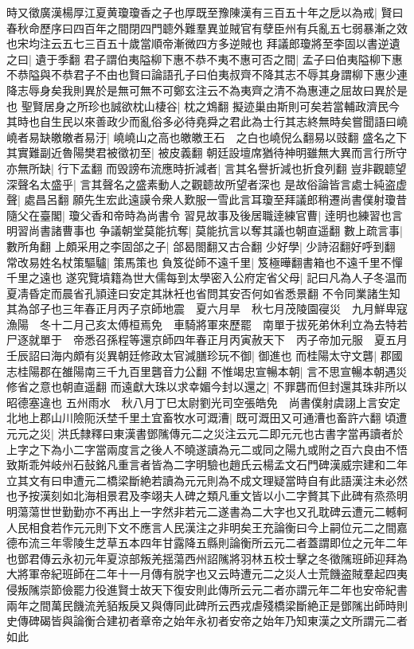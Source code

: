 時又徵廣漢楊厚江夏黄瓊瓊香之子也厚既至豫陳漢有三百五十年之戹以為戒|{
	賢曰春秋命歷序曰四百年之間閉四門聼外難羣異並賊官有孽臣州有兵亂五七弱暴漸之效也宋均注云五七三百五十歲當順帝漸微四方多逆賊也}
拜議郎瓊將至李固以書逆遺之曰|{
	遺于季翻}
君子謂伯夷隘柳下惠不恭不夷不惠可否之間|{
	孟子曰伯夷隘柳下惠不恭隘與不恭君子不由也賢曰論語孔子曰伯夷叔齊不降其志不辱其身謂柳下惠少連降志辱身矣我則異於是無可無不可鄭玄注云不為夷齊之清不為惠連之屈故曰異於是也}
聖賢居身之所珍也誠欲枕山棲谷|{
	枕之鴆翻}
擬迹巢由斯則可矣若當輔政濟民今其時也自生民以來善政少而亂俗多必待堯舜之君此為士行其志終無時矣嘗聞語曰嶢嶢者易缺皦皦者易汙|{
	嶢嶢山之高也皦皦王石　之白也嶢倪么翻易以豉翻}
盛名之下其實難副近魯陽樊君被徵初至|{
	被皮義翻}
朝廷設壇席猶待神明雖無大異而言行所守亦無所缺|{
	行下孟翻}
而毁謗布流應時折減者|{
	言其名譽折減也折食列翻}
豈非觀聼望深聲名太盛乎|{
	言其聲名之盛素動人之觀聼故所望者深也}
是故俗論皆言處士純盗虚聲|{
	處昌呂翻}
願先生宏此遠謨令衆人歎服一雪此言耳瓊至拜議郎稍遷尚書僕射瓊昔隨父在臺閣|{
	瓊父香和帝時為尚書令}
習見故事及後居職逹練官曹|{
	逹明也練習也言明習尚書諸曹事也}
争議朝堂莫能抗奪|{
	莫能抗言以奪其議也朝直遥翻}
數上疏言事|{
	數所角翻}
上頗采用之李固郃之子|{
	郃曷閤翻又古合翻}
少好學|{
	少詩沼翻好呼到翻}
常改易姓名杖策驅驢|{
	策馬策也}
負笈從師不遠千里|{
	笈極曄翻書箱也不遠千里不憚千里之遠也}
遂究覽墳籍為世大儒每到太學密入公府定省父母|{
	記曰凡為人子冬温而夏凊昏定而晨省孔頴逹曰安定其牀衽也省問其安否何如省悉景翻}
不令同業諸生知其為郃子也三年春正月丙子京師地震　夏六月旱　秋七月茂陵園寑災　九月鮮卑寇漁陽　冬十二月己亥太傅桓焉免　車騎將軍來歷罷　南單于拔死弟休利立為去特若尸逐就單于　帝悉召孫程等還京師四年春正月丙寅赦天下　丙子帝加元服　夏五月壬辰詔曰海内頗有災異朝廷修政太官減膳珍玩不御|{
	御進也}
而桂陽太守文礱|{
	郡國志桂陽郡在雒陽南三千九百里礱音力公翻}
不惟竭忠宣暢本朝|{
	言不思宣暢本朝遇災修省之意也朝直遥翻}
而遠獻大珠以求幸媚今封以還之|{
	不罪礱而但封還其珠非所以昭德塞違也}
五州雨水　秋八月丁巳太尉劉光司空張皓免　尚書僕射虞詡上言安定北地上郡山川險阨沃埜千里土宜畜牧水可溉漕|{
	既可溉田又可通漕也畜許六翻}
頃遭元元之災|{
	洪氏隸釋曰東漢書鄧隲傳元二之災注云元二即元元也古書字當再讀者於上字之下為小二字當兩度言之後人不曉遂讀為元二或同之陽九或附之百六良由不悟致斯乖舛岐州石鼔銘凡重言者皆為二字明驗也趙氏云楊孟文石門碑漢威宗建和二年立其文有曰申遭元二橋梁斷絶若讀為元元則為不成文理疑當時自有此語漢注未必然也予按漢刻如北海相景君及李翊夫人碑之類凡重文皆以小二字贅其下此碑有烝烝明明蕩蕩世世勤勤亦不再出上一字然非若元二遂書為二大字也又孔耽碑云遭元二轗軻人民相食若作元元則下文不應言人民漢注之非明矣王充論衡曰今上嗣位元二之間嘉德布流三年零陵生芝草五本四年甘露降五縣則論衡所云元二者蓋謂即位之元年二年也鄧君傳云永初元年夏涼部叛羌揺蕩西州詔隲將羽林五校士擊之冬徵隲班師迎拜為大將軍帝紀班師在二年十一月傳有脱字也又云時遭元二之災人士荒饑盗賊羣起四夷侵叛隲崇節儉罷力役進賢士故天下復安則此傳所云元二者亦謂元年二年也安帝紀書兩年之間萬民饑流羌貊叛戾又與傳同此碑所云西戎虐殘橋梁斷絶正是鄧隲出師時則史傳碑碣皆與論衡合建初者章帝之始年永初者安帝之始年乃知東漢之文所謂元二者如此}

